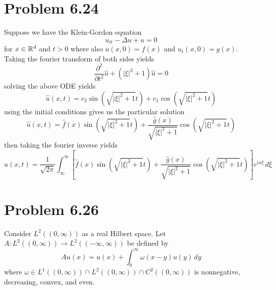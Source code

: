 \documentclass[12pt]{report}
\begin{document}
\section*{Problem 6.24}
Suppose we have the Klein-Gordon equation
\begin{equation*}
    u_{tt} - \Delta u + u = 0
\end{equation*}
for $x \in \mathbb{R}^d$ and $t > 0$ where also $u(x,0) = f(x)$ and $u_t(x,0) = g(x)$. Taking the fourier transform of both sides yields
\begin{equation*}
    \frac{\partial^2}{\partial t^2} \hat{u} + (|\xi|^2 +1)\hat{u} = 0
\end{equation*}
solving the above ODE yields
\begin{equation*}
    \hat{u}(x,t) = c_2 \sin\left(\sqrt{|\xi|^2 + 1}t\right) + c_1 \cos\left(\sqrt{|\xi|^2 + 1}t\right)
\end{equation*}
using the initial conditions gives us the particular solution
\begin{equation*}
    \hat{u}(x,t) = \hat{f}(x) \sin\left(\sqrt{|\xi|^2 + 1}t\right) + \frac{\hat{g}(x)}{\sqrt{|\xi|^2 + 1}}\cos\left(\sqrt{|\xi|^2 + 1}t\right)
\end{equation*}
then taking the fourier inverse yields
\begin{equation*}
    u(x,t) = \frac{1}{\sqrt{2\pi}} \int_{\infty}^\infty\left[\hat{f}(x) \sin\left(\sqrt{|\xi|^2 + 1}t\right) + \frac{\hat{g}(x)}{\sqrt{|\xi|^2 + 1}}\cos\left(\sqrt{|\xi|^2 + 1}t\right)\right]e^{ix\xi} \, d\xi 
\end{equation*}

\section*{Problem 6.26}
Consider $L^2((0,\infty))$ as a real Hilbert space. Let $A: L^2((0,\infty)) \to L^2((-\infty,\infty))$ be defined by
\begin{equation*}
    Au(x) = u(x) + \int_0^\infty \omega(x-y)u(y) \, dy
\end{equation*}
where $\omega \in L^1((0,\infty)) \cap L^2((0,\infty)) \cap C^2((0,\infty))$ is nonnegative, decreasing, convex, and even.
\end{document}
